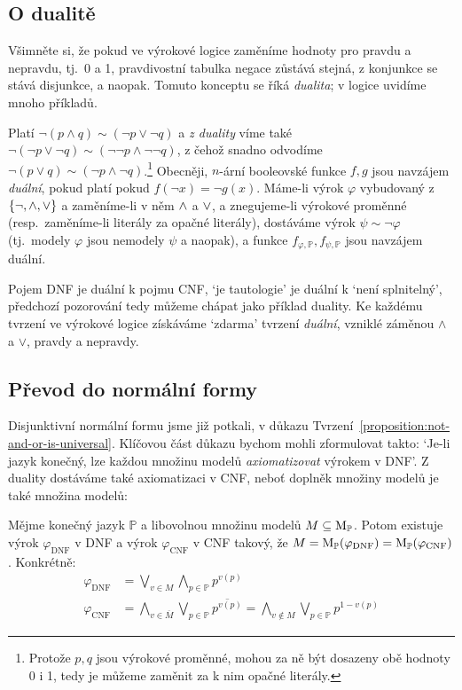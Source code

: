 \subsection{O dualitě}

Všimněte si, že pokud ve výrokové logice zaměníme hodnoty pro pravdu a nepravdu, tj.\ 0 a 1, pravdivostní tabulka negace zůstává stejná, z konjunkce se stává disjunkce, a naopak. Tomuto konceptu se říká \emph{dualita}; v logice uvidíme mnoho příkladů. 

Platí $\neg(p\land q)\sim (\neg p\lor \neg q)$ a \emph{z duality} víme také $\neg(\neg p\lor \neg q)\sim (\neg \neg p\land \neg \neg q)$, z čehož snadno odvodíme $\neg(p\lor q)\sim (\neg p\land \neg q)$.\footnote{Protože $p,q$ jsou výrokové proměnné, mohou za ně být dosazeny obě hodnoty 0 i 1, tedy je můžeme zaměnit za k nim opačné literály.} Obecněji, $n$-ární booleovské funkce $f,g$ jsou navzájem \emph{duální}, pokud platí pokud $f(\neg x)=\neg g(x)$. Máme-li výrok $\varphi$ vybudovaný z $\{\neg,{\land},{\lor}\}$ a zaměníme-li v něm ${\land}$ a ${\lor}$, a znegujeme-li výrokové proměnné (resp.\ zaměníme-li literály za opačné literály), dostáváme výrok $\psi\sim\neg\varphi$ (tj.\ modely $\varphi$ jsou nemodely $\psi$ a naopak), a funkce $f_{\varphi,\mathbb P},f_{\psi,\mathbb P}$ jsou navzájem duální.

Pojem DNF je duální k pojmu CNF, `je tautologie' je duální k `není splnitelný', předchozí pozorování tedy můžeme chápat jako příklad duality. Ke každému tvrzení ve výrokové logice získáváme `zdarma' tvrzení \emph{duální}, vzniklé záměnou $\land$ a $\lor$, pravdy a nepravdy.


\subsection{Převod do normální formy}\label{subsection:convert-to-normal-form}

Disjunktivní normální formu jsme již potkali, v důkazu Tvrzení~\ref{proposition:not-and-or-is-universal}. Klíčovou část důkazu bychom mohli zformulovat takto: `Je-li jazyk konečný, lze každou množinu modelů \emph{axiomatizovat} výrokem v DNF'. Z duality dostáváme také axiomatizaci v CNF, neboť doplněk množiny modelů je také množina modelů:

\begin{proposition} \label{proposition:axiomatize-in-DNF-CNF}
    Mějme konečný jazyk $\mathbb P$ a libovolnou množinu modelů $M\subseteq\operatorname{M}_\mathbb P$. Potom existuje výrok $\varphi_{\mathrm{DNF}}$ v DNF a výrok $\varphi_{\mathrm{CNF}}$ v CNF takový, že $M=\operatorname{M}_\mathbb P(\varphi_{\mathrm{DNF}})=\operatorname{M}_\mathbb P(\varphi_{\mathrm{CNF}})$. Konkrétně:
\begin{align*}
    \varphi_{\mathrm{\mathrm{DNF}}} &= \bigvee_{v\in M}\bigwedge_{p\in\mathbb P}p^{v(p)}\\
    \varphi_{\mathrm{CNF}} &= \bigwedge_{v\in \overline{M}}\bigvee_{p\in\mathbb P}\overline{p^{v(p)}}=\bigwedge_{v\notin M}\bigvee_{p\in\mathbb P}p^{1-v(p)}
\end{align*}
\end{proposition}


